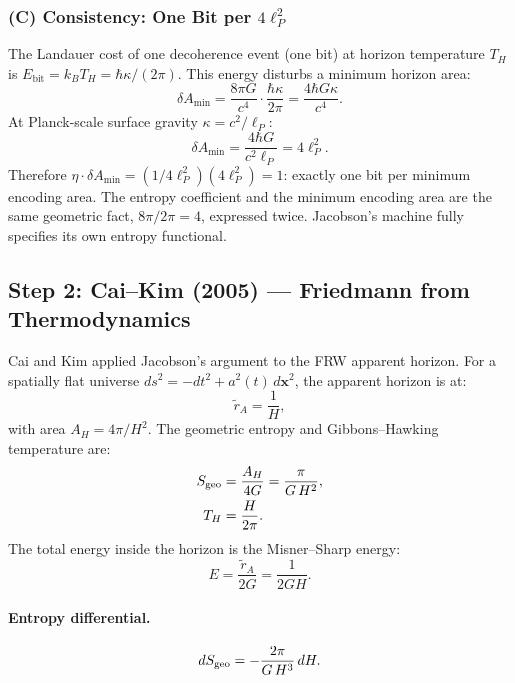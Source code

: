\documentclass[12pt,a4paper]{article}
\begin{document}
\subsubsection*{(C) Consistency: One Bit per $4\ell_P^2$}

The Landauer cost of one decoherence event (one bit) at horizon temperature
$T_H$ is $E_\mathrm{bit} = k_B T_H = \hbar\kappa/(2\pi)$. This energy
disturbs a minimum horizon area:
\begin{equation}
\delta A_\mathrm{min} = \frac{8\pi G}{c^4}\cdot\frac{\hbar\kappa}{2\pi}
= \frac{4\hbar G\kappa}{c^4}.
\end{equation}
At Planck-scale surface gravity $\kappa = c^2/\ell_P$:
\begin{equation}
\delta A_\mathrm{min} = \frac{4\hbar G}{c^2\ell_P} = 4\ell_P^2.
\end{equation}
Therefore $\eta \cdot \delta A_\mathrm{min} = (1/4\ell_P^2)(4\ell_P^2) = 1$:
exactly one bit per minimum encoding area. The entropy coefficient and the
minimum encoding area are the same geometric fact, $8\pi/2\pi = 4$, expressed
twice. Jacobson's machine fully specifies its own entropy functional.

\subsection{Step 2: Cai--Kim (2005) --- Friedmann from Thermodynamics}

Cai and Kim applied Jacobson's argument to the FRW apparent horizon.
For a spatially flat universe $ds^2 = -dt^2 + a^2(t)\,d\mathbf{x}^2$,
the apparent horizon is at:
\begin{equation}
\tilde{r}_A = \frac{1}{H},
\label{eq:apparent_horizon}
\end{equation}
with area $A_H = 4\pi/H^2$. The geometric entropy and Gibbons--Hawking
temperature are:
\begin{align}
S_{\rm geo} &= \frac{A_H}{4G} = \frac{\pi}{G\,H^2},
\label{eq:Sgeo}\\
T_H &= \frac{H}{2\pi}.
\label{eq:TH}
\end{align}
The total energy inside the horizon is the Misner--Sharp energy:
\begin{equation}
E = \frac{\tilde{r}_A}{2G} = \frac{1}{2GH}.
\label{eq:misner_sharp}
\end{equation}

\paragraph{Entropy differential.}
\begin{equation}
dS_{\rm geo} = -\frac{2\pi}{G\,H^3}\,dH.
\label{eq:dSgeo}
\end{equation}
\end{document}
